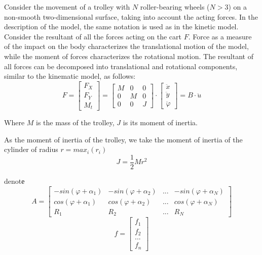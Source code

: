 \documentclass[oneside,final,14pt]{extreport}
\begin{document}
Consider the movement of a trolley with $ N $ roller-bearing wheels ($ N> 3 $) on a non-smooth two-dimensional surface, taking into account the acting forces. In the description of the model, the same notation is used as in the kinetic model. Consider the resultant of all the forces acting on the cart $ F $. Force as a measure of the impact on the body characterizes the translational motion of the model, while the moment of forces characterizes the rotational motion. The resultant of all forces can be decomposed into translational and rotational components, similar to the kinematic model, as follows:
\begin{equation}
F
=
\begin{bmatrix}
F_{X} \\
F_{Y} \\
M_{t}
\end{bmatrix}
=
\begin{bmatrix}
M & 0 & 0 \\
0 & M & 0 \\
0 & 0 & J
\end{bmatrix}
\cdot
\begin{bmatrix}
\ddot{x} \\
\ddot{y} \\
\ddot{\varphi}
\end{bmatrix}
=
B \cdot \ddot{u}
\end{equation}

Where $ M $ is the mass of the trolley, $ J $ is its moment of inertia.

As the moment of inertia of the trolley, we take the moment of inertia of the cylinder of radius $r=max_{i}(r_{i})$ 
\begin{equation}
J
=
\frac{1}{2}
Mr^{2}
\end{equation}

denotе
\begin{equation}
A 
= 
\begin{bmatrix}
-sin(\varphi + \alpha_{1}) &
-sin(\varphi + \alpha_{2}) &
... 					   &
-sin(\varphi + \alpha_{N}) \\
cos(\varphi + \alpha_{1}) &
cos(\varphi + \alpha_{2}) &
... 					   &
cos(\varphi + \alpha_{N}) \\ 
R_{1} & R_{2} & ... & R_{N}
\end{bmatrix}
\end{equation}
\begin{equation}
f
=
\begin{bmatrix}
f_{1} \\
f_{2} \\
...   \\
f_{n}
\end{bmatrix}
\end{equation}
\end{document}
